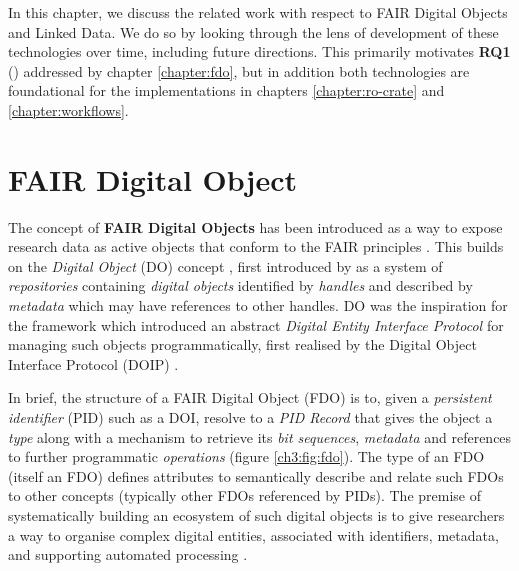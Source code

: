 \label{ch3:background}

In this chapter, we discuss the related work with respect to FAIR Digital Objects and Linked Data. We do so by looking through the lens of development of these technologies over time, including future directions. This primarily motivates \textbf{RQ1} () addressed by chapter \ref{chapter:fdo}, but in addition both technologies are foundational for the implementations in chapters \ref{chapter:ro-crate} and \ref{chapter:workflows}.


\section{FAIR Digital Object}\label{ch3:fdo}


The concept of \textbf{FAIR Digital Objects} \cite{Schultes 2019} has been introduced as a way to expose research data as active objects that conform to the FAIR principles \cite{Wilkinson 2016}. This builds on the \emph{Digital Object} (DO) concept \cite{Kahn 2006}, first introduced by \cite{kahnFrameworkDistributedDigital1995a} as a system of \emph{repositories} containing \emph{digital objects} identified by \emph{handles} \cite{rfc3650} and described by \emph{metadata} which may have references to other handles. DO was the inspiration for the \cite{x1255FrameworkDiscovery} framework which introduced an abstract \emph{Digital Entity Interface Protocol} for managing such objects programmatically, first realised by the Digital Object Interface Protocol (DOIP) \cite{DigitalObjectInterface}.

In brief, the structure of a FAIR Digital Object (FDO) is to, given a \emph{persistent identifier} (PID) such as a DOI, resolve to a \emph{PID Record} that gives the object a \emph{type} along with a mechanism to retrieve its \emph{bit sequences}, \emph{metadata} and references to further programmatic \emph{operations} (figure \vref{ch3:fig:fdo}). The type of an FDO (itself an FDO) defines attributes to semantically describe and relate such FDOs to other concepts (typically other FDOs referenced by PIDs). The premise of systematically building an ecosystem of such digital objects is to give researchers a way to organise complex digital entities, associated with identifiers, metadata, and supporting automated processing \cite{wittenburgDigitalObjectsDrivers2019a}.

